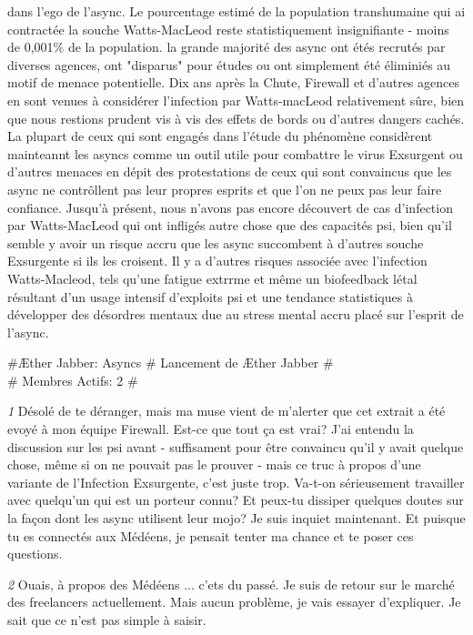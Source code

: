 dans l'ego de l'async. Le pourcentage estimé de la population transhumaine qui ai contractée la souche Watts-MacLeod reste statistiquement insignifiante - moins de 0,001\% de la population. la grande majorité des async ont étés recrutés par diverses agences, ont "disparus" pour études ou ont simplement été éliminiés au motif de menace potentielle. Dix ans après la Chute, Firewall et d'autres agences en sont venues à considérer l'infection par Watts-macLeod relativement sûre, bien que nous restions prudent vis à vis des effets de bords ou d'autres dangers cachés. La plupart de ceux qui sont engagés dans l'étude du phénomène considèrent mainteannt les asyncs comme un outil utile pour combattre le virus Exsurgent ou d'autres menaces en dépit des protestations de ceux qui sont convaincus que les async ne contrôllent pas leur propres esprits et que l'on ne peux pas leur faire confiance. Jusqu'à présent, nous n'avons pas encore découvert de cas d'infection par Watts-MacLeod qui ont infligés autre chose que des capacités psi, bien qu'il semble y avoir un risque accru que les async succombent à d'autres souche Exsurgente si ils les croisent. Il y a d'autres risques associée avec l'infection Watts-Macleod, tels qu'une fatigue extrrme et même un biofeedback létal résultant d'un usage intensif d'exploits psi et une tendance statistiques à développer des désordres mentaux due au stress mental accru placé sur l'esprit de l'async. 

\newpage

\#{Æther Jabber: Asyncs} \# Lancement de Æther Jabber \# \\ \# Membres Actifs: 2 \# 

\textit{\textit{1}} Désolé de te déranger, mais ma muse vient de m'alerter que cet extrait a été evoyé à mon équipe Firewall. Est-ce que tout ça est vrai? J'ai entendu la discussion sur les psi avant - suffisament pour être convaincu qu'il y avait quelque chose, même si on ne pouvait pas le prouver - mais ce truc à propos d'une variante de l'Infection Exsurgente, c'est juste trop. Va-t-on sérieusement travailler avec quelqu'un qui est un porteur connu? Et peux-tu dissiper quelques doutes sur la façon dont les async utilisent leur mojo? Je suis inquiet maintenant. Et puisque tu es connectés aux Médéens, je pensait tenter ma chance et te poser ces questions. 

\textit{\textit{2}} Ouais, à propos des Médéens ... c'ets du passé. Je suis de retour sur le marché des freelancers actuellement. Mais aucun problème, je vais essayer d'expliquer. Je sait que ce n'est pas simple à saisir. 


